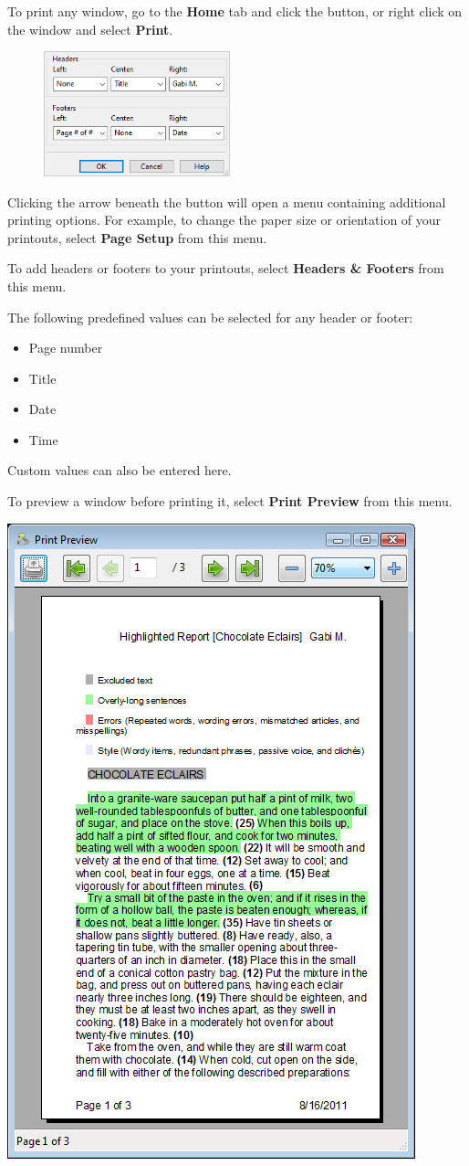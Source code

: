 \documentclass[
]{book}
\providecommand{\tightlist}{%
  \setlength{\itemsep}{0pt}\setlength{\parskip}{0pt}}
\theoremstyle{definition}
\theoremstyle{definition}
\theoremstyle{definition}
\theoremstyle{definition}
\theoremstyle{remark}
\begin{document}
To print any window, go to the \textbf{Home} tab and click the  button, or right click on the window and select \textbf{Print}.

\begin{figure}
\includegraphics[width=0.48\textwidth,height=\textheight]{Images/printerheadersfooters.png}

\end{figure}

Clicking the arrow beneath the  button will open a menu containing additional printing options. For example, to change the paper size or orientation of your printouts, select \textbf{Page Setup} from this menu.

To add headers or footers to your printouts, select \textbf{Headers \& Footers} from this menu.

The following predefined values can be selected for any header or footer:

\begin{itemize}
\tightlist
\item
  Page number
\item
  Title
\item
  Date
\item
  Time
\end{itemize}

Custom values can also be entered here.

To preview a window before printing it, select \textbf{Print Preview} from this menu.

\begin{center}\includegraphics[width=0.5\linewidth,]{Images/NonGenerated/printpreview} \end{center}
\end{document}
